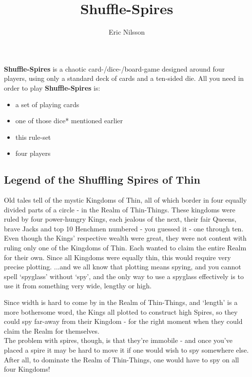 \documentclass[11pt,twocolumn]{article}
\title{Shuffle-Spires}
\author{Eric Nilsson}
\date{}
\begin{document}
\maketitle

\noindent
\textbf{Shuffle-Spires} is a chaotic card-/dice-/board-game designed around four players, using only a standard deck of cards and a ten-sided die.
All you need in order to play \textbf{Shuffle-Spires} is:
\begin{itemize}[noitemsep]
\renewcommand{\labelitemi}{$\bullet$}
\item a set of playing cards
\item one of those dice* mentioned earlier
\item this rule-set
\item four players
\end{itemize}

\subsection{Legend of the Shuffling Spires of Thin}
\label{sec:legendoftheshufflingspiresofthin}
Old tales tell of the mystic Kingdoms of Thin, all of which border in four equally divided parts of a circle - in the Realm of Thin-Things.
These kingdoms were ruled by four power-hungry Kings, each jealous of the next, their fair Queens, brave Jacks and top 10 Henchmen numbered - you guessed it - one through ten.
Even though the Kings’ respective wealth were great, they were not content with ruling only one of the Kingdoms of Thin. Each wanted to claim the entire Realm for their own. Since all Kingdoms were equally thin, this would require very precise plotting.
...and we all know that plotting means spying, and you cannot spell ‘spyglass’ without ‘spy’, and the only way to use a spyglass effectively is to use it from something very wide, lengthy or high.

Since width is hard to come by in the Realm of Thin-Things, and ‘length’ is a more bothersome word, the Kings all plotted to construct high Spires, so they could spy far-away from their Kingdom - for the right moment when they could claim the Realm for themselves.\\

\noindent
The problem with spires, though, is that they’re immobile - and once you’ve placed a spire it may be hard to move it if one would wish to spy somewhere else.
After all, to dominate the Realm of Thin-Things, one would have to spy on all four Kingdoms!
\end{document}
